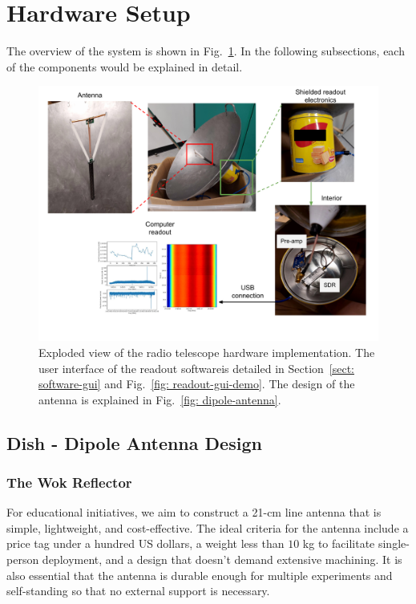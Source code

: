 \documentclass[12pt]{article}
\begin{document}
    \section{Hardware Setup} \label{sect: hardware}
    The overview of the system is shown in Fig.~\ref{fig: system-diagram}. 
    In the following subsections, each of the components would be explained in detail.
    \begin{figure}
	    \centering
	    \includegraphics[width=\textwidth]{plots/wok-draw-1.pdf}
	    \caption{Exploded view of the radio telescope hardware implementation. The user interface of the readout softwareis detailed in Section~\ref{sect: software-gui} and Fig.~\ref{fig: readout-gui-demo}. The design of the antenna is explained in Fig.~\ref{fig: dipole-antenna}.}
	    \label{fig: system-diagram}
	\end{figure}
    
    \subsection{Dish - Dipole Antenna Design}
    \subsubsection{The Wok Reflector}
    For educational initiatives, we aim to construct a 21-cm line antenna that is simple, lightweight, and cost-effective. The ideal criteria for the antenna include a price tag under a hundred US dollars, a weight less than $10$ kg to facilitate single-person deployment, and a design that doesn't demand extensive machining. 
    It is also essential that the antenna is durable enough for multiple experiments and self-standing so that no external support is necessary.
\end{document}
